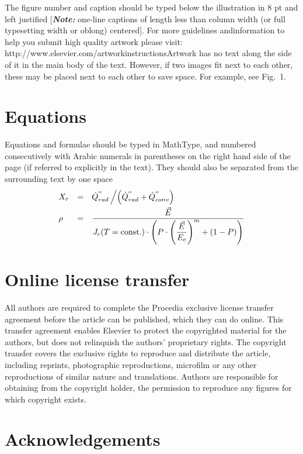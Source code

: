 \documentclass[5p,times,procedia]{Definitions/elsarticle}
\begin{document}
The figure number and caption should be typed below the illustration in 8 pt and left justified [{\bfseries\itshape Note:} one-line captions of length less than column width (or full typesetting width or oblong) centered]. For more guidelines and\break information to help you submit high quality artwork please visit: http://www.elsevier.com/artworkinstructions\break Artwork has no text along the side of it in the main body of the text. However, if two images fit next to each other, these may be placed next to each other to save space. For example, see Fig.~1.


\section{Equations}
Equations and formulae should be typed in MathType, and numbered consecutively with Arabic numerals in parentheses on the right hand side of the page (if referred to explicitly in the text). They should also be separated from the surrounding text by one space
\begin{equation}
\begin{array}{lcl}
\displaystyle X_r &=& \displaystyle\dot{Q}^{''}_{rad}\left/\left(\dot{Q}^{''}_{rad} + \dot{Q}^{''}_{conv}\right)\right.\\[6pt]
\displaystyle \rho &=& \displaystyle\frac{\vec{E}}{J_c(T={\rm const.})\cdot\left(P\cdot\left(\displaystyle\frac{\vec{E}}{E_c}\right)^m+(1-P)\right)}
\end{array}
\end{equation}


\section{Online license transfer}
All authors are required to complete the Procedia exclusive license transfer agreement before the article can be published, which they can do online. This transfer agreement enables Elsevier to protect the copyrighted material for the authors, but does not relinquish the authors' proprietary rights. The copyright transfer covers the exclusive rights to reproduce and distribute the article, including reprints, photographic reproductions, microfilm or any other reproductions of similar nature and translations. Authors are responsible for obtaining from the copyright holder, the permission to reproduce any figures for which copyright exists.

\vfill\pagebreak

\section*{Acknowledgements}
\end{document}
